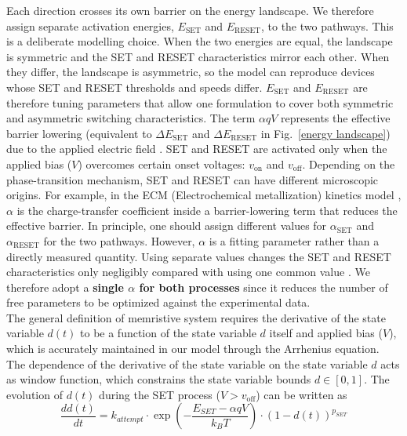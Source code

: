 \documentclass[aip,apl,reprint,floatfix]{revtex4-2}
\begin{document}
Each direction crosses its own barrier on the energy landscape. We therefore assign separate activation energies, $E_{\text{SET}}$ and $E_{\text{RESET}}$, to the two pathways. This is a deliberate modelling choice. When the two energies are equal, the landscape is symmetric and the SET and RESET characteristics mirror each other. When they differ, the landscape is asymmetric, so the model can reproduce devices whose SET and RESET thresholds and speeds differ. $E_{\text{SET}}$ and $E_{\text{RESET}}$ are therefore tuning parameters that allow one formulation to cover both symmetric and asymmetric switching characteristics.
 The term $\alpha qV$ represents the effective barrier lowering (equivalent to $\Delta E_{\text{SET}}$ and $\Delta E_{\text{RESET}}$ in Fig.~\ref{energy landscape}) due to the applied electric field \cite{Russo,Ielmini}. SET and RESET are activated only when the applied bias ($V$) overcomes certain onset voltages: $v_{\text{on}}$ and $v_{\text{off}}$. Depending on the phase-transition mechanism, SET and RESET can have different microscopic origins. For example, in the ECM (Electrochemical metallization)  kinetics model \cite{Menzel}, $\alpha$ is the charge-transfer coefficient inside a barrier-lowering term that reduces the effective barrier. In principle, one should assign different values for $\alpha_{\text{SET}}$ and $\alpha_{\text{RESET}}$ for the two pathways. However, $\alpha$ is a fitting parameter rather than a directly measured quantity. Using separate values changes the SET and RESET characteristics only negligibly compared with using one common value \cite{Ielmini}. We therefore adopt a \textbf{single $\alpha$ for both processes} since it reduces the number of free parameters to be optimized against the experimental data.
\\The general definition of memristive system requires the derivative of the state variable $d(t)$ to be a function of the state variable $d$ itself and applied bias ($V$), which is accurately maintained in our model through the Arrhenius equation. The dependence of the derivative of the state variable on the state variable $d$ acts as window function, which constrains the state variable bounds $d \in [0,1]$.
The evolution of $d(t)$ during the SET process ($V > v_{\text{off}}$) can be written as
\begin{equation}
    \frac{dd(t)}{dt} = k_{attempt} \cdot \exp\left( -\frac{E_{SET} - \alpha qV}{k_B T} \right) \cdot \left(1 - d(t)\right)^{p_{SET}}
    \label{eq:set}
\end{equation}
\end{document}
